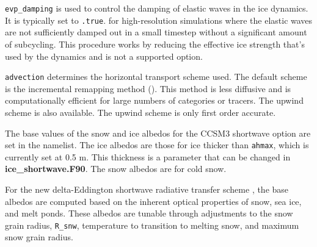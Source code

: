 {\tt evp\_damping} is used to control the damping of elastic waves in
the ice dynamics.  It is typically set to {\tt .true}. for high-resolution
simulations where the elastic waves are not sufficiently damped out in a
small timestep without a significant amount of subcycling.  This procedure
works by reducing the effective ice strength that's used by the dynamics
and is not a supported option.

{\tt advection} determines the horizontal transport scheme used. The default
scheme is the incremental remapping method (\cite{lipshunke04}).  This method
is less diffusive and is computationally efficient for large numbers of 
categories or tracers.  The upwind scheme is also available. The upwind scheme 
is only first order accurate.
 
The base values of the snow and ice albedos for the CCSM3 shortwave option
are set in the namelist.  The ice albedos are those for ice thicker than 
{\tt ahmax}, which is currently set at 0.5 m.  This thickness is a parameter 
that can be changed in {\bf ice\_shortwave.F90}. The snow albedos are for 
cold snow. 

For the new delta-Eddington shortwave radiative transfer scheme 
\cite{Briegleb07}, the base albedos are computed based on the inherent 
optical properties of snow, sea ice, and melt ponds. These albedos are 
tunable through adjustments to the snow grain radius, {\tt R\_snw}, 
temperature to transition to melting snow, and maximum snow grain radius.

